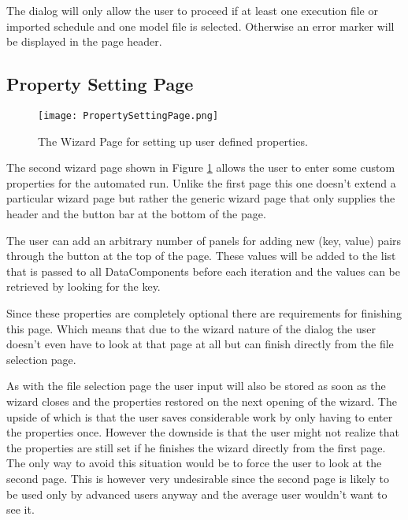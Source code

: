 The dialog will only allow the user to proceed if at least one execution file or imported schedule and one
model file is selected. Otherwise an error marker will be displayed in the page header.

\subsection{Property Setting Page}
\label{section:PropertySettingPage}
\begin{figure}
  \centering
  \texttt{[image: PropertySettingPage.png]}
  \caption[The Wizard Page for setting up user defined properties.]%
  {The Wizard Page for setting up user defined properties.\protect}
  \label{fig:PropertySettingPage}
\end{figure}
The second wizard page shown in Figure \ref{fig:PropertySettingPage} allows the user to enter some custom
properties for the automated run. Unlike the first page this one doesn't extend a particular wizard page but
rather the generic wizard page that only supplies the header and the button bar at the bottom of the page.

The user can add an arbitrary number of panels for adding new (key, value) pairs through the button at the
top of the page. These values will be added to the list that is passed to all DataComponents before each iteration
and the values can be retrieved by looking for the key.

Since these properties are completely optional there are requirements for finishing this page. Which means that due
to the wizard nature of the dialog the user doesn't even have to look at that page at all but can finish directly
from the file selection page.

As with the file selection page the user input will also be stored as soon as the wizard closes and the properties
restored on the next opening of the wizard. The upside of which is that the user saves considerable work by only
having to enter the properties once. However the downside is that the user might not realize that the properties are
still set if he finishes the wizard directly from the first page. The only way to avoid this situation would be to
force the user to look at the second page. This is however very undesirable since the second page is likely to be used
only by advanced users anyway and the average user wouldn't want to see it.

